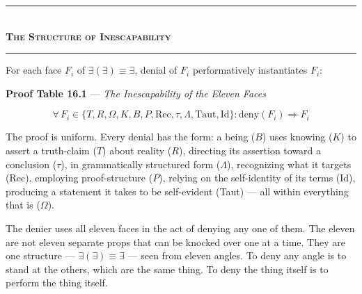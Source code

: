 \documentclass[10pt, openany, oneside]{book}
\renewcommand{\normalsize}{\fontsize{10}{13}\selectfont}
\begin{document}
\begin{center}
    \rule{0.3\textwidth}{0.4pt}\\[0.5em]
    {\normalsize\bfseries\scshape The Structure of Inescapability}\\[0.3em]
    \rule{0.3\textwidth}{0.4pt}
\end{center}

\vspace{1em}

\noindent For each face $F_i$ of $\exists(\exists) \equiv \exists$, denial of $F_i$ performatively instantiates $F_i$:

\vspace{0.5em}

\textbf{Proof Table 16.1} --- \textit{The Inescapability of the Eleven Faces}

\vspace{0.5em}

$$\forall\, F_i \in \{T, R, \Omega, K, B, P, \text{Rec}, \tau, \Lambda, \text{Taut}, \text{Id}\}: \text{deny}(F_i) \Rightarrow F_i$$

The proof is uniform. Every denial has the form: a being ($B$) uses knowing ($K$) to assert a truth-claim ($T$) about reality ($R$), directing its assertion toward a conclusion ($\tau$), in grammatically structured form ($\Lambda$), recognizing what it targets (Rec), employing proof-structure ($P$), relying on the self-identity of its terms (Id), producing a statement it takes to be self-evident (Taut) --- all within everything that is ($\Omega$).

The denier uses all eleven faces in the act of denying any one of them. The eleven are not eleven separate props that can be knocked over one at a time. They are one structure --- $\exists(\exists) \equiv \exists$ --- seen from eleven angles. To deny any angle is to stand at the others, which are the same thing. To deny the thing itself is to perform the thing itself.
\end{document}
